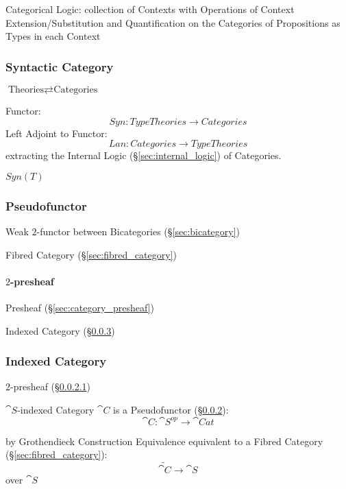 Categorical Logic: collection of Contexts with Operations of Context
Extension/Substitution and Quantification on the Categories of
Propositions as Types in each Context



\subsubsection{Syntactic Category}\label{sec:syntactic_category}

$\text{Theories} \rightleftarrows \text{Categories}$

Functor:
\[
  Syn : TypeTheories \rightarrow Categories
\]
Left Adjoint to Functor:
\[
  Lan : Categories \rightarrow TypeTheories
\]
extracting the Internal Logic (\S\ref{sec:internal_logic}) of
Categories.

$Syn(T)$



\subsubsection{Pseudofunctor}\label{sec:pseudofunctor}

Weak $2$-functor between Bicategories (\S\ref{sec:bicategory})

Fibred Category (\S\ref{sec:fibred_category})



\paragraph{$2$-presheaf}\label{sec:2_presheaf}

Presheaf (\S\ref{sec:category_presheaf})

Indexed Category (\S\ref{sec:indexed_category})



\subsubsection{Indexed Category}\label{sec:indexed_category}

$2$-presheaf (\S\ref{sec:2_presheaf})

$\cat{S}$-indexed Category $\cat{C}$ is a Pseudofunctor
(\S\ref{sec:pseudofunctor}):
\[
  \cat{C}: \cat{S}^{op} \rightarrow \cat{Cat}
\]

by Grothendieck Construction Equivalence %
equivalent to a Fibred Category (\S\ref{sec:fibred_category}):
\[
  \tilde{\cat{C}} \rightarrow \cat{S}
\]
over $\cat{S}$



